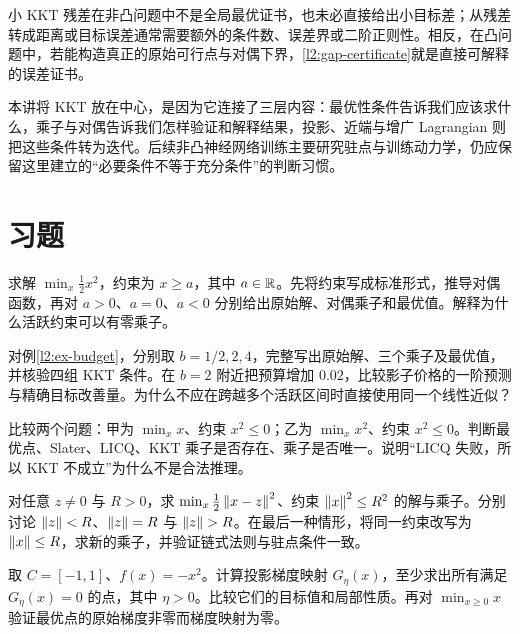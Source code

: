 小 KKT 残差在非凸问题中不是全局最优证书，也未必直接给出小目标差；从残差转成距离或目标误差通常需要额外的条件数、误差界或二阶正则性。相反，在凸问题中，若能构造真正的原始可行点与对偶下界，\eqref{l2:gap-certificate}就是直接可解释的误差证书。

本讲将 KKT 放在中心，是因为它连接了三层内容：最优性条件告诉我们应该求什么，乘子与对偶告诉我们怎样验证和解释结果，投影、近端与增广 Lagrangian 则把这些条件转为迭代。后续非凸神经网络训练主要研究驻点与训练动力学，仍应保留这里建立的“必要条件不等于充分条件”的判断习惯。

\section{习题}
\label{l2:exercises}

\begin{exercise}
\label{l2:exercise-dual}
求解 $\min_x\tfrac12x^2$，约束为 $x\geq a$，其中 $a\in\mathbb R$。先将约束写成标准形式，推导对偶函数，再对 $a>0$、$a=0$、$a<0$ 分别给出原始解、对偶乘子和最优值。解释为什么活跃约束可以有零乘子。
\end{exercise}

\begin{exercise}[二维预算问题的活跃集]
\label{l2:exercise-budget}
对例\ref{l2:ex-budget}，分别取 $b=1/2,2,4$，完整写出原始解、三个乘子及最优值，并核验四组 KKT 条件。在 $b=2$ 附近把预算增加 $0.02$，比较影子价格的一阶预测与精确目标改善量。为什么不应在跨越多个活跃区间时直接使用同一个线性近似？
\end{exercise}

\begin{exercise}[资格条件失败时究竟失去什么]
\label{l2:exercise-cq}
比较两个问题：甲为 $\min_x x$、约束 $x^2\leq0$；乙为 $\min_x x^2$、约束 $x^2\leq0$。判断最优点、Slater、LICQ、KKT 乘子是否存在、乘子是否唯一。说明“LICQ 失败，所以 KKT 不成立”为什么不是合法推理。
\end{exercise}

\begin{exercise}[二次球约束与单位变换]
\label{l2:exercise-ball}
对任意 $z\ne0$ 与 $R>0$，求 $\min_x\tfrac12\left\lVert x-z\right\rVert^2$、约束 $\left\lVert x\right\rVert^2\leq R^2$ 的解与乘子。分别讨论 $\left\lVert z\right\rVert<R$、$\left\lVert z\right\rVert=R$ 与 $\left\lVert z\right\rVert>R$。在最后一种情形，将同一约束改写为 $\left\lVert x\right\rVert\leq R$，求新的乘子，并验证链式法则与驻点条件一致。
\end{exercise}

\begin{exercise}[投影驻点与非凸反例]
\label{l2:exercise-projection}
取 $C=[-1,1]$、$f(x)=-x^2$。计算投影梯度映射 $G_\eta(x)$，至少求出所有满足 $G_\eta(x)=0$ 的点，其中 $\eta>0$。比较它们的目标值和局部性质。再对 $\min_{x\geq0}x$ 验证最优点的原始梯度非零而梯度映射为零。
\end{exercise}

